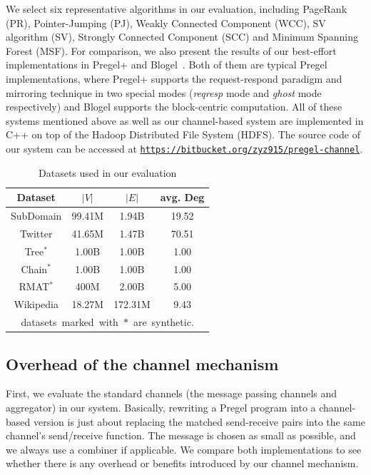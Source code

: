 \documentclass{sokendai_thesis} %
\newcommand{\CC}{C++}
\newcommand{\PP}{Pregel+}
\begin{document}
We select six representative algorithms in our evaluation, including PageRank (PR), Pointer-Jumping (PJ), Weakly Connected Component (WCC), SV algorithm (SV), Strongly Connected Component (SCC) and Minimum Spanning Forest (MSF).
For comparison, we also present the results of our best-effort implementations in \PP{} \cite{yan2015effective} and Blogel~\cite{yan2014blogel}.
Both of them are typical Pregel implementations, where \PP{} supports the request-respond paradigm and mirroring technique in two special modes (\textit{reqresp} mode and \textit{ghost} mode respectively) and Blogel supports the block-centric computation.
All of these systems mentioned above as well as our channel-based system are implemented in \CC{} on top of the Hadoop Distributed File System (HDFS).
The source code of our system can be accessed at \texttt{\url{https://bitbucket.org/zyz915/pregel-channel}}.

\begin{table}[t]
\centering
\caption{Datasets used in our evaluation}
\label{tab:datasets}
\begin{tabular}{c|c|c|c}
\hline
\textbf{Dataset} & $|V|$ & $|E|$ & avg. Deg \\
\hline\hline
SubDomain & 99.41M & 1.94B & 19.52 \\
\hline
Twitter & 41.65M & 1.47B & 70.51 \\
\hline
Tree$^{*}$ & 1.00B & 1.00B & 1.00 \\
\hline
Chain$^{*}$ & 1.00B & 1.00B & 1.00 \\
\hline
RMAT$^{*}$ &  400M & 2.00B & 5.00 \\
\hline
Wikipedia & 18.27M & 172.31M & 9.43 \\
\hline
\multicolumn{4}{c}{\hbox{datasets marked with $*$ are synthetic.}}
\end{tabular}
\end{table}

\subsection{Overhead of the channel mechanism}
\label{sec:eval-channel}

First, we evaluate the standard channels (the message passing channels and aggregator) in our system.
Basically, rewriting a Pregel program into a channel-based version is just about replacing the matched send-receive pairs into the same channel's send/receive function.
The message is chosen as small as possible, and we always use a combiner if applicable.
We compare both implementations to see whether there is any overhead or benefits introduced by our channel mechanism.
\end{document}
